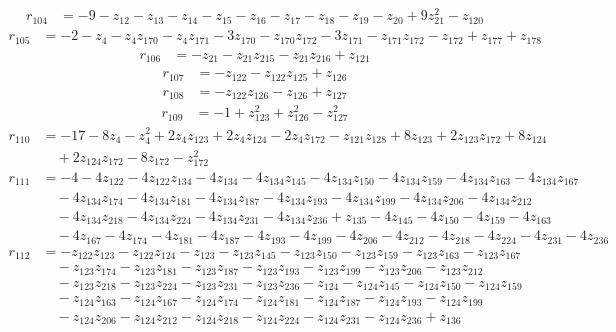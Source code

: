 \begin{align*}
r_{104} &=-9-z_{12}-z_{13}-z_{14}-z_{15}-z_{16}-z_{17}-z_{18}-z_{19}-z_{20}+9z_{21}^{2}-z_{120}
\end{align*}
\begin{align*}
r_{105} &=-2-z_{4}-z_{4}z_{170}-z_{4}z_{171}-3z_{170}-z_{170}z_{172}-3z_{171}-z_{171}z_{172}-z_{172}+z_{177}+z_{178}
\end{align*}
\begin{align*}
r_{106} &=-z_{21}-z_{21}z_{215}-z_{21}z_{216}+z_{121}
\end{align*}
\begin{align*}
r_{107} &=-z_{122}-z_{122}z_{125}+z_{126}
\end{align*}
\begin{align*}
r_{108} &=-z_{122}z_{126}-z_{126}+z_{127}
\end{align*}
\begin{align*}
r_{109} &=-1+z_{123}^{2}+z_{126}^{2}-z_{127}^{2}
\end{align*}
\begin{align*}
r_{110} &=-17-8z_{4}-z_{4}^{2}+2z_{4}z_{123}+2z_{4}z_{124}-2z_{4}z_{172}-z_{121}z_{128}+8z_{123}+2z_{123}z_{172}+8z_{124}\\
&\quad +2z_{124}z_{172}-8z_{172}-z_{172}^{2}
\end{align*}
\begin{align*}
r_{111} &=-4-4z_{122}-4z_{122}z_{134}-4z_{134}-4z_{134}z_{145}-4z_{134}z_{150}-4z_{134}z_{159}-4z_{134}z_{163}-4z_{134}z_{167}\\
&\quad -4z_{134}z_{174}-4z_{134}z_{181}-4z_{134}z_{187}-4z_{134}z_{193}-4z_{134}z_{199}-4z_{134}z_{206}-4z_{134}z_{212}\\
&\quad -4z_{134}z_{218}-4z_{134}z_{224}-4z_{134}z_{231}-4z_{134}z_{236}+z_{135}-4z_{145}-4z_{150}-4z_{159}-4z_{163}\\
&\quad -4z_{167}-4z_{174}-4z_{181}-4z_{187}-4z_{193}-4z_{199}-4z_{206}-4z_{212}-4z_{218}-4z_{224}-4z_{231}-4z_{236}
\end{align*}
\begin{align*}
r_{112} &=-z_{122}z_{123}-z_{122}z_{124}-z_{123}-z_{123}z_{145}-z_{123}z_{150}-z_{123}z_{159}-z_{123}z_{163}-z_{123}z_{167}\\
&\quad -z_{123}z_{174}-z_{123}z_{181}-z_{123}z_{187}-z_{123}z_{193}-z_{123}z_{199}-z_{123}z_{206}-z_{123}z_{212}\\
&\quad -z_{123}z_{218}-z_{123}z_{224}-z_{123}z_{231}-z_{123}z_{236}-z_{124}-z_{124}z_{145}-z_{124}z_{150}-z_{124}z_{159}\\
&\quad -z_{124}z_{163}-z_{124}z_{167}-z_{124}z_{174}-z_{124}z_{181}-z_{124}z_{187}-z_{124}z_{193}-z_{124}z_{199}\\
&\quad -z_{124}z_{206}-z_{124}z_{212}-z_{124}z_{218}-z_{124}z_{224}-z_{124}z_{231}-z_{124}z_{236}+z_{136}
\end{align*}
